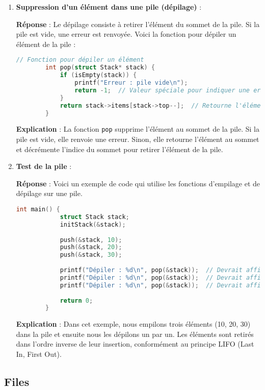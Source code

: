 \begin{enumerate}
	\item \textbf{Suppression d'un élément dans une pile (dépilage)} :
	
	\textbf{Réponse} :
	Le dépilage consiste à retirer l'élément du sommet de la pile. Si la pile est vide, une erreur est renvoyée. Voici la fonction pour dépiler un élément de la pile :
	
	\begin{lstlisting}[language=C]
		// Fonction pour dépiler un élément
		int pop(struct Stack* stack) {
			if (isEmpty(stack)) {
				printf("Erreur : pile vide\n");
				return -1;  // Valeur spéciale pour indiquer une erreur
			}
			return stack->items[stack->top--];  // Retourne l'élément au sommet puis décrémente le sommet
		}
	\end{lstlisting}
	
	\textbf{Explication} :
	La fonction \texttt{pop} supprime l'élément au sommet de la pile. Si la pile est vide, elle renvoie une erreur. Sinon, elle retourne l'élément au sommet et décrémente l'indice du sommet pour retirer l'élément de la pile.
	
	\item \textbf{Test de la pile} :
	
	\textbf{Réponse} :
	Voici un exemple de code qui utilise les fonctions d'empilage et de dépilage sur une pile.
	
	\begin{lstlisting}[language=C]
		int main() {
			struct Stack stack;
			initStack(&stack);
			
			push(&stack, 10);
			push(&stack, 20);
			push(&stack, 30);
			
			printf("Dépiler : %d\n", pop(&stack));  // Devrait afficher 30
			printf("Dépiler : %d\n", pop(&stack));  // Devrait afficher 20
			printf("Dépiler : %d\n", pop(&stack));  // Devrait afficher 10
			
			return 0;
		}
	\end{lstlisting}
	
	\textbf{Explication} :
	Dans cet exemple, nous empilons trois éléments (10, 20, 30) dans la pile et ensuite nous les dépilons un par un. Les éléments sont retirés dans l'ordre inverse de leur insertion, conformément au principe LIFO (Last In, First Out).
	
\end{enumerate}

%

\subsection{Files}

